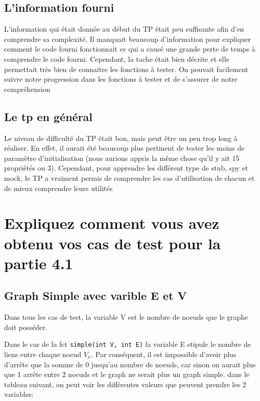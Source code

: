 \documentclass[11pt]{article}
\begin{document}
\subsection{L'information fourni}
L'information qui était donnée au début du TP était peu suffisante afin d'en comprendre sa complexité.
Il manquait beaucoup d'information pour expliquer comment le code fourni fonctionnait ce qui a causé une grande perte de temps à comprendre le code fourni.
Cependant, la tache était bien décrite et elle permettait très bien de connaitre les fonctions à tester.
On pouvait facilement suivre notre progression dans les fonctions à tester et de s'assurer de notre compréhension

\subsection{Le tp en général}
Le niveau de difficulté du TP était bon, mais peut être un peu trop long à réaliser.
En effet, il aurait été beaucoup plus pertinent de tester les moins de paramètre d'initialisation (nous aurions appris la même chose qu'il y ait 15 propriétés ou 3).
Cependant, pour apprendre les différent type de stub, spy et mock, le TP a vraiment permis de comprendre les cas d'utilisation de chacun et de mieux comprendre leurs utilités

\section{Expliquez comment vous avez obtenu vos cas de test pour la partie 4.1}
\subsection{Graph Simple avec varible E et V}
Dans tous les cas de test, la variable V est le nombre de noeuds que le graphe doit posséder.

Dans le cas de la fct \verb|simple(int V, int E)| la variable E stipule le nombre de liens entre chaque noeud $V_x$.
Par conséquent, il est impossible d'avoir plus d'arrête que la somme de 0 jusqu'au nombre de noeuds, car sinon on aurait plus que 1 arrête entre 2 noeuds et le graph ne serait plus un graph simple.
dans le tableau suivant, on peut voir les différentes valeurs que peuvent prendre les 2 variables:
\end{document}
